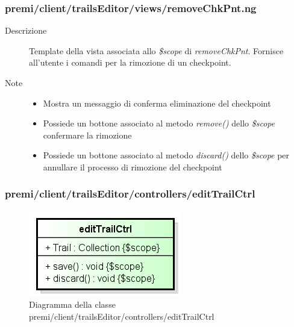 \subsubsection{premi/client/trailsEditor/views/removeChkPnt.ng}

\begin{description}
\item[Descrizione] \hfill
	Template della vista associata allo \textit{\$scope} di \textit{removeChkPnt}. Fornisce all'utente i comandi per la rimozione di un checkpoint.
\item[Note] \hfill
	\begin{itemize}
			\item Mostra un messaggio di conferma eliminazione del checkpoint
			\item Possiede un bottone associato al metodo \textit{remove()} dello \textit{\$scope} confermare la rimozione
			\item Possiede un bottone associato al metodo \textit{discard()} dello \textit{\$scope} per annullare il processo di rimozione del checkpoint
	\end{itemize}
\end{description}


































\subsubsection{premi/client/trailsEditor/controllers/editTrailCtrl}
\begin{figure}[H]
\begin{center}
\includegraphics[scale=0.95]{img/diacla/editTrailCtrl.png}
\caption{Diagramma della classe premi/client/trailsEditor/controllers/editTrailCtrl}
\end{center}
\end{figure}


